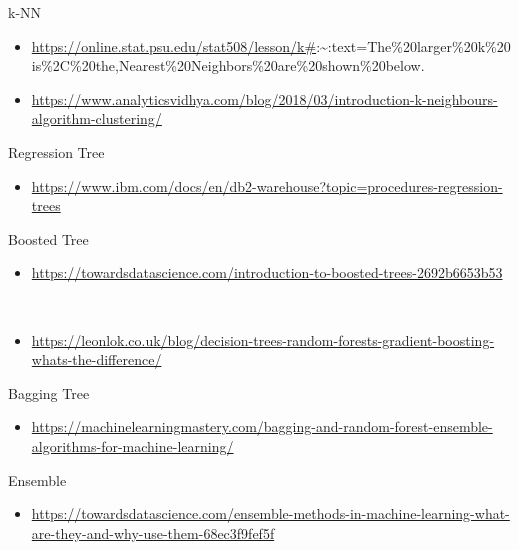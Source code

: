 \documentclass[
  paper=a4,
  ,captions=tableheading
]{scrartcl}
\providecommand{\tightlist}{%
  \setlength{\itemsep}{0pt}\setlength{\parskip}{0pt}}
\begin{document}
k-NN

\begin{itemize}
\tightlist
\item
  \url{https://online.stat.psu.edu/stat508/lesson/k\#}:\textasciitilde:text=The\%20larger\%20k\%20is\%2C\%20the,Nearest\%20Neighbors\%20are\%20shown\%20below.
\item
  \url{https://www.analyticsvidhya.com/blog/2018/03/introduction-k-neighbours-algorithm-clustering/}
\end{itemize}

Regression Tree

\begin{itemize}
\tightlist
\item
  \url{https://www.ibm.com/docs/en/db2-warehouse?topic=procedures-regression-trees}
\end{itemize}

Boosted Tree

\begin{itemize}
\tightlist
\item
  \url{https://towardsdatascience.com/introduction-to-boosted-trees-2692b6653b53}\strut \\
\item
  \url{https://leonlok.co.uk/blog/decision-trees-random-forests-gradient-boosting-whats-the-difference/}
\end{itemize}

Bagging Tree

\begin{itemize}
\tightlist
\item
  \url{https://machinelearningmastery.com/bagging-and-random-forest-ensemble-algorithms-for-machine-learning/}
\end{itemize}

Ensemble

\begin{itemize}
\tightlist
\item
  \url{https://towardsdatascience.com/ensemble-methods-in-machine-learning-what-are-they-and-why-use-them-68ec3f9fef5f}
\end{itemize}
\end{document}
